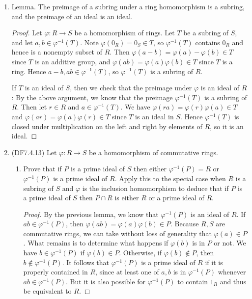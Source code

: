 \documentclass[11pt]{article}
\begin{document}
\begin{enumerate}
\begin{proof}
      Hence $L_j = M_n(R)E_{ij}$ for any $i$.
    \end{proof}
    \item Lemma. The preimage of a subring under a ring homomorphism is a subring, and the preimage of an ideal is an ideal.
    \begin{proof}
      Let $\varphi\colon R\to S$ be a homomorphism of rings. Let $T$ be a subring of $S$, and let $a,b\in \varphi^{-1}(T)$. Note $\varphi(0_R) = 0_S\in T$, so $\varphi^{-1}(T)$ contains $0_R$ and hence is a nonempty subset of $R$. Then $\varphi(a-b) = \varphi(a) - \varphi(b)\in T$ since $T$ is an additive group, and $\varphi(ab) = \varphi(a)\varphi(b)\in T$ since $T$ is a ring. Hence $a-b, ab\in \varphi^{-1}(T)$, so $\varphi^{-1}(T)$ is a subring of $R$.

      If $T$ is an ideal of $S$, then we check that the preimage under $\varphi$ is an ideal of $R$: By the above argument, we know that the preimage $\varphi^{-1}(T)$ is a subring of $R$. Then let $r\in R$ and $a\in \varphi^{-1}(T)$. We have $\varphi(ra) = \varphi(r)\varphi(a)\in T$ and $\varphi(ar) = \varphi(a)\varphi(r)\in T$ since $T$ is an ideal in $S$. Hence $\varphi^{-1}(T)$ is closed under multiplication on the left and right by elements of $R$, so it is an ideal.
    \end{proof}
    \item (DF7.4.13) Let $\varphi\colon R\to S$ be a homomorphism of commutative rings. \begin{enumerate}[label=\textbf{(\alph*)}]
      \item Prove that if $P$ is a prime ideal of $S$ then either $\varphi^{-1}(P) = R$ or $\varphi^{-1}(P)$ is a prime ideal of $R$. Apply this to the special case when $R$ is a subring of $S$ and $\varphi$ is the inclusion homomorphism to deduce that if $P$ is a prime ideal of $S$ then $P\cap R$ is either $R$ or a prime ideal of $R$.
      \begin{proof}
        By the previous lemma, we know that $\varphi^{-1}(P)$ is an ideal of $R$. If $ab\in \varphi^{-1}(P)$, then $\varphi(ab) = \varphi(a)\varphi(b)\in P$. Because $R,S$ are commutative rings, we can take without loss of generality that $\varphi(a)\in P$. What remains is to determine what happens if $\varphi(b)$ is in $P$ or not. We have $b\in \varphi^{-1}(P)$ if $\varphi(b)\in P$. Otherwise, if $\varphi(b)\not\in P$, then $b\not\in \varphi^{-1}(P)$. It follows that $\varphi^{-1}(P)$ is a prime ideal of $R$ if it is properly contained in $R$, since at least one of $a,b$ is in $\varphi^{-1}(P)$ whenever $ab\in \varphi^{-1}(P)$. But it is also possible for $\varphi^{-1}(P)$ to contain $1_R$ and thus be equivalent to $R$.


\end{proof}
\end{enumerate}
\end{enumerate}
\end{document}
